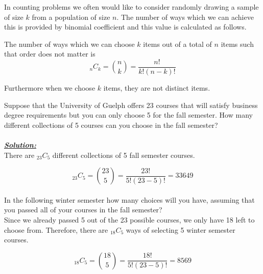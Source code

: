 In counting problems we often would like to consider 
randomly drawing a sample of size $k$ from a population of size $n$.
The number of ways which we can achieve this is provided by
binomial coefficient and this value is calculated as follows.

\begin{definition}
\label{definitionBinomialCoefficient}
The number of ways which we can choose $k$ items out of a total of $n$ items such that order does not matter is 
		\begin{equation}
		{_{n}C_{k}} = {n \choose k} = \frac{ n! }{ k! (n - k)! }
		\end{equation}
\end{definition}

\noindent
Furthermore when we choose $k$ items, they are not distinct items.\\

\begin{example}
Suppose that the University of Guelph offers 23 courses that will satisfy business degree requirements but you can only choose 5 for the fall semester. How many different collections of 5 courses can you choose in the fall semester? \\

\hfill\\
{\emph{\textbf{\underline{Solution:}}}}\\


There are $_{23}C_{5}$ different collections of 5 fall semester courses.

\[ _{23}C_{5} = {23 \choose 5} = \frac{23!}{5!(23-5)!} = 33649 \]
\\
In the following winter semester how many choices will you have, assuming that you passed all of your courses in the fall semester?\\

Since we already passed 5 out of the 23 possible courses, we only have 18 left to choose from. Therefore, there are $_{18} C_{5}$ ways of selecting 5 winter semester courses.

\[ _{18} C_{5} = {18 \choose 5} = \frac{18!}{5!(23-5)!}=8569\]

\end{example}

